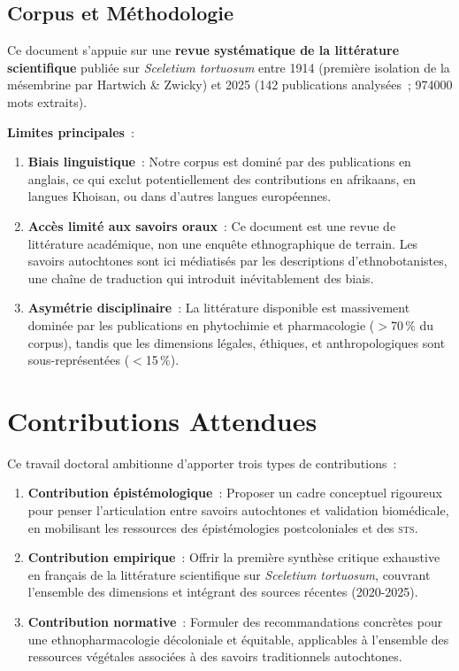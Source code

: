 \documentclass[12pt,a4paper,twoside]{book}
\newcommand{\kanna}{\textit{Sceletium tortuosum}}
\begin{document}
\subsection{Corpus et Méthodologie}

Ce document s'appuie sur une \textbf{revue systématique de la littérature scientifique} publiée sur \kanna{} entre 1914 (première isolation de la mésembrine par Hartwich \& Zwicky) et 2025 (142 publications analysées~; \SI{974000}{} mots extraits).

\textbf{Limites principales}~:

\begin{enumerate}
\item \textbf{Biais linguistique}~: Notre corpus est dominé par des publications en anglais, ce qui exclut potentiellement des contributions en afrikaans, en langues Khoisan, ou dans d'autres langues européennes.

\item \textbf{Accès limité aux savoirs oraux}~: Ce document est une revue de littérature académique, non une enquête ethnographique de terrain. Les savoirs autochtones sont ici médiatisés par les descriptions d'ethnobotanistes, une chaîne de traduction qui introduit inévitablement des biais.

\item \textbf{Asymétrie disciplinaire}~: La littérature disponible est massivement dominée par les publications en phytochimie et pharmacologie ($>$70\,\% du corpus), tandis que les dimensions légales, éthiques, et anthropologiques sont sous-représentées ($<$15\,\%).
\end{enumerate}

\section{Contributions Attendues}

Ce travail doctoral ambitionne d'apporter trois types de contributions~:

\begin{enumerate}
\item \textbf{Contribution épistémologique}~: Proposer un cadre conceptuel rigoureux pour penser l'articulation entre savoirs autochtones et validation biomédicale, en mobilisant les ressources des épistémologies postcoloniales et des \textsc{sts}.

\item \textbf{Contribution empirique}~: Offrir la première synthèse critique exhaustive en français de la littérature scientifique sur \kanna{}, couvrant l'ensemble des dimensions et intégrant des sources récentes (2020-2025).

\item \textbf{Contribution normative}~: Formuler des recommandations concrètes pour une ethnopharmacologie décoloniale et équitable, applicables à l'ensemble des ressources végétales associées à des savoirs traditionnels autochtones.
\end{enumerate}
\end{document}
